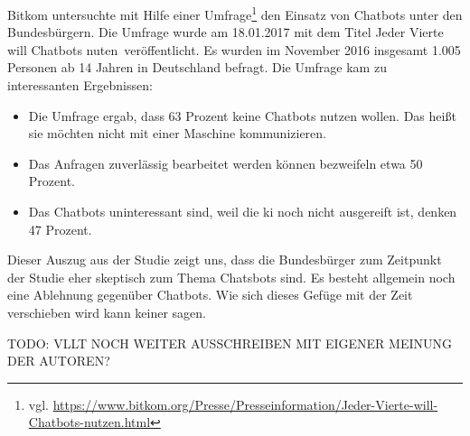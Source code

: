 Bitkom untersuchte mit Hilfe einer Umfrage\footnote{vgl. \url{https://www.bitkom.org/Presse/Presseinformation/Jeder-Vierte-will-Chatbots-nutzen.html}} den Einsatz von Chatbots unter den Bundesbürgern. Die Umfrage wurde am 18.01.2017 mit dem Titel \glqq Jeder Vierte will Chatbots nuten\grqq\ veröffentlicht. Es wurden im November 2016 insgesamt 1.005 Personen ab 14 Jahren in Deutschland befragt. Die Umfrage kam zu interessanten Ergebnissen:
\begin{itemize}
 	\item Die Umfrage ergab, dass 63 Prozent keine Chatbots nutzen wollen. Das heißt sie möchten nicht mit einer Maschine kommunizieren. 
	 \item Das Anfragen zuverlässig bearbeitet werden können bezweifeln etwa 50 Prozent.
	 \item Das Chatbots uninteressant sind, weil die \ac{ki} noch nicht ausgereift ist, denken 47 Prozent.
\end{itemize}
Dieser Auszug aus der Studie zeigt uns, dass die Bundesbürger zum Zeitpunkt der Studie eher skeptisch zum Thema Chatsbots sind. Es besteht allgemein noch eine Ablehnung gegenüber Chatbots. Wie sich dieses Gefüge mit der Zeit verschieben wird kann keiner sagen.  

TODO: VLLT NOCH WEITER AUSSCHREIBEN MIT EIGENER MEINUNG DER AUTOREN?







